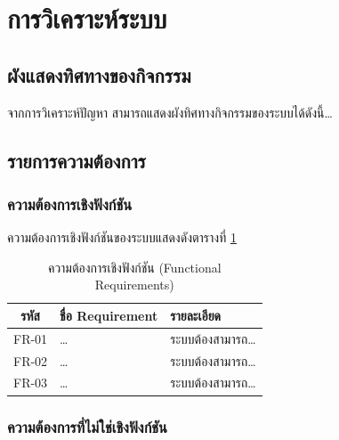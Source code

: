 
\section{การวิเคราะห์ระบบ}

\subsection{ผังแสดงทิศทางของกิจกรรม}

จากการวิเคราะห์ปัญหา สามารถแสดงผังทิศทางกิจกรรมของระบบได้ดังนี้\ldots{}

\subsection{รายการความต้องการ}

\subsubsection{ความต้องการเชิงฟังก์ชัน}

ความต้องการเชิงฟังก์ชันของระบบแสดงดังตารางที่ \ref{tab:func_req}

\begin{table}[H]
\centering
\caption{ความต้องการเชิงฟังก์ชัน (Functional Requirements)}
\label{tab:func_req}
\begin{tabular}{|c|l|l|}
\hline
\textbf{รหัส} & \textbf{ชื่อ Requirement} & \textbf{รายละเอียด} \\
\hline
FR-01 & \ldots & ระบบต้องสามารถ\ldots \\ \hline
FR-02 & \ldots & ระบบต้องสามารถ\ldots \\ \hline
FR-03 & \ldots & ระบบต้องสามารถ\ldots \\
\hline
\end{tabular}
\end{table}

\subsubsection{ความต้องการที่ไม่ใช่เชิงฟังก์ชัน}

